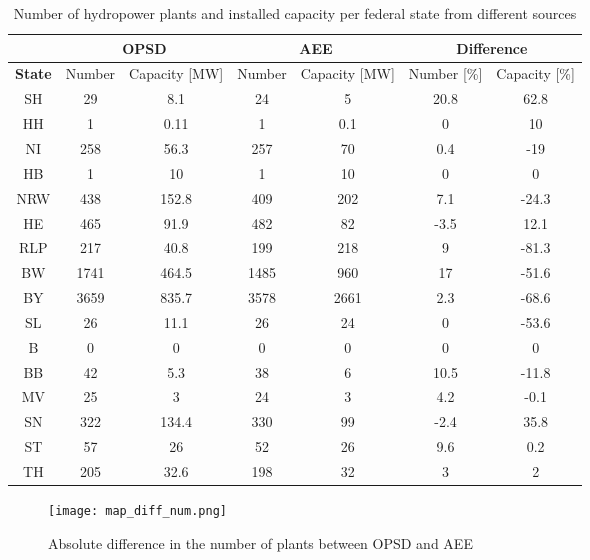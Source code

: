 \begin{table}[H]
\footnotesize 
 \centering
 \caption[Number of hydropower plants and installed capacity per federal state from different sources]{Number of hydropower plants and installed capacity per federal state from different sources}
 \label{oedb_aee_diff}
 \begin{tabular}{|c|cc|cc| cc|}
  \cline{2-7}
  \multicolumn{0}{c|}{} &\multicolumn{2}{c}{\textbf{OPSD \cite{oedb}}}&\multicolumn{2}{|c|}{\textbf{AEE \cite{aee}}}&\multicolumn{2}{c|}{\textbf{Difference}} \\
  \hline
  \textbf{State} & Number 	& 	Capacity [\unit{MW}] 	&	Number 	& 	Capacity [\unit{MW}] 	&	Number [\unit{\%}] 	&	Capacity [\unit{\%}] \\
  \hline
  SH	&	29	&	8.1		&	24	&	5		&	20.8		&	62.8	\\
  HH	&	1	&	0.11		&	1	&	0.1		&	0		&	10	\\
  NI	&	258	&	56.3		&	257	&	70		&	0.4		&	-19	\\
  HB	&	1	&	10		&	1	&	10		&	0		&	0	\\
  NRW	&	438	&	152.8		&	409	&	202		&	7.1		&	-24.3	\\
  HE	&	465	&	91.9		&	482	&	82		&	-3.5		&	12.1	\\
  RLP	&	217	&	40.8		&	199	&	218		&	9		&	-81.3	\\
  BW	&	1741	&	464.5		&	1485	&	960		&	17		&	-51.6	\\	
  BY	&	3659	&	835.7		&	3578	&	2661		&	2.3		&	-68.6	\\
  SL	&	26	&	11.1		&	26	&	24		&	0		&	-53.6	\\
  B	&	0	&	0		&	0	&	0		&	0		&	0	\\
  BB	&	42	&	5.3		&	38	&	6		&	10.5		&	-11.8	\\
  MV	&	25	&	3		&	24	&	3		&	4.2		&	-0.1	\\
  SN	&	322	&	134.4		&	330	&	99		&	-2.4		&	35.8	\\
  ST	&	57	&	26		&	52	&	26		&	9.6		&	0.2	\\
  TH	&	205	&	32.6		&	198	&	32		&	3		&	2	\\
  \hline
 \end{tabular} 
\end{table}


\begin{figure}[H]
\centering
\texttt{[image: map\_diff\_num.png]}
\caption[Absolute difference in the number of plants between OPSD and AEE]{Absolute difference in the number of plants between OPSD and AEE}
\label{map_diff_num}
\end{figure}


